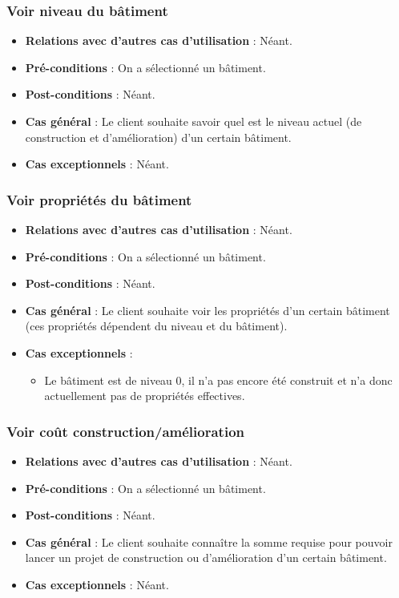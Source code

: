 \documentclass[a4paper,titlepage]{scrreprt}
\begin{document}
    \subsubsection{Voir niveau du bâtiment}
      \begin{itemize}
        \item \textbf{Relations avec d'autres cas d'utilisation}  : Néant.
        \item \textbf{Pré-conditions} : On a sélectionné un bâtiment.
        \item \textbf{Post-conditions} : Néant.
        \item \textbf{Cas général} : Le client souhaite savoir quel est le niveau actuel (de construction et d'amélioration) d’un certain bâtiment. 
        \item \textbf{Cas exceptionnels} : Néant.
      \end{itemize}
    \subsubsection{Voir propriétés du bâtiment}
      \begin{itemize}
        \item \textbf{Relations avec d'autres cas d'utilisation}  : Néant.
        \item \textbf{Pré-conditions} : On a sélectionné un bâtiment.
        \item \textbf{Post-conditions} : Néant.
        \item \textbf{Cas général} : Le client souhaite voir les propriétés d’un certain bâtiment (ces propriétés dépendent du niveau et du bâtiment).
        \item \textbf{Cas exceptionnels} :
          \begin{itemize}
            \item Le bâtiment est de niveau 0, il n'a pas encore été construit et n'a donc actuellement pas de propriétés effectives.
          \end{itemize}
      \end{itemize}
    \subsubsection{Voir coût construction/amélioration}
      \begin{itemize}
        \item \textbf{Relations avec d'autres cas d'utilisation}  : Néant.
        \item \textbf{Pré-conditions} : On a sélectionné un bâtiment.
        \item \textbf{Post-conditions} : Néant.
        \item \textbf{Cas général} : Le client souhaite connaître la somme requise pour pouvoir lancer un projet de construction ou d’amélioration d’un certain bâtiment.
        \item \textbf{Cas exceptionnels} : Néant.
      \end{itemize}
\end{document}
